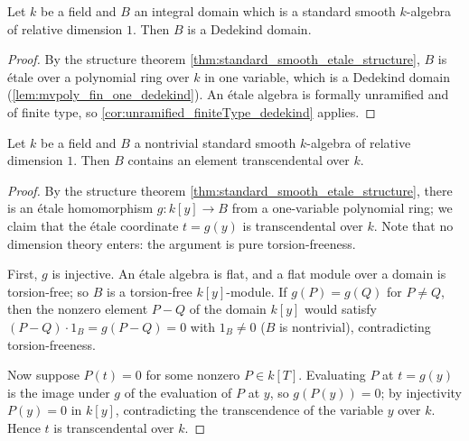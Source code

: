 \begin{theorem}
  \label{thm:standard_smooth_dim_one_dedekind}
  \leanok
  Let \(k\) be a field and \(B\) an integral domain which is a standard smooth
  \(k\)-algebra of relative dimension \(1\). Then \(B\) is a Dedekind domain.
\end{theorem}
\begin{proof}
  \leanok
  By the structure theorem \ref{thm:standard_smooth_etale_structure}, \(B\) is \'etale over
  a polynomial ring over \(k\) in one variable, which is a Dedekind domain
  (\ref{lem:mvpoly_fin_one_dedekind}). An \'etale algebra is formally unramified and of
  finite type, so \ref{cor:unramified_finiteType_dedekind} applies.
\end{proof}

\begin{theorem}
  \label{thm:standard_smooth_transcendental}
  \leanok
  Let \(k\) be a field and \(B\) a nontrivial standard smooth \(k\)-algebra of relative
  dimension \(1\). Then \(B\) contains an element transcendental over \(k\).
\end{theorem}
\begin{proof}
  \leanok
  By the structure theorem \ref{thm:standard_smooth_etale_structure}, there is an \'etale
  homomorphism \(g : k[y] \to B\) from a one-variable polynomial ring; we claim that the
  \'etale coordinate \(t = g(y)\) is transcendental over \(k\). Note that no dimension
  theory enters: the argument is pure torsion-freeness.

  First, \(g\) is injective. An \'etale algebra is flat, and a flat module over a domain is
  torsion-free; so \(B\) is a torsion-free \(k[y]\)-module. If \(g(P) = g(Q)\) for
  \(P \neq Q\), then the nonzero element \(P - Q\) of the domain \(k[y]\) would satisfy
  \((P - Q) \cdot 1_B = g(P - Q) = 0\) with \(1_B \neq 0\) (\(B\) is nontrivial),
  contradicting torsion-freeness.

  Now suppose \(P(t) = 0\) for some nonzero \(P \in k[T]\). Evaluating \(P\) at \(t = g(y)\)
  is the image under \(g\) of the evaluation of \(P\) at \(y\), so \(g(P(y)) = 0\); by
  injectivity \(P(y) = 0\) in \(k[y]\), contradicting the transcendence of the variable
  \(y\) over \(k\). Hence \(t\) is transcendental over \(k\).
\end{proof}

